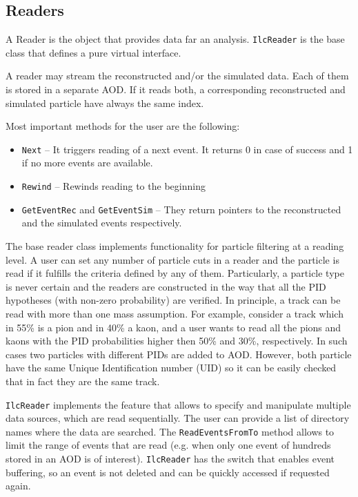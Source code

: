 \documentclass[12pt,a4paper,twoside]{article}
\begin{document}
{%

\subsection{Readers}
\label{cap:soft:secReaders}

A Reader is the object that provides data far an analysis.
\texttt{IlcReader} is the base class that defines a pure virtual
interface. 

A reader may stream the reconstructed and/or the 
simulated data. Each of them is stored in a separate AOD.
If it reads both, a corresponding reconstructed and 
simulated particle have always the same index. 

Most important methods for the user are the following:
\begin{itemize}
\item   \texttt{Next} -- It triggers reading of a next event. It returns 
  0 in case of success and 1 if no more events 
  are available.
\item   \texttt{Rewind} --  Rewinds reading to the beginning
\item   \texttt{GetEventRec} and \texttt{GetEventSim} --  They return 
  pointers to the reconstructed and the simulated events respectively.
\end{itemize}

The base reader class implements functionality for
particle filtering at a reading level. A user can set any
number of particle cuts in a reader and the particle is
read if it fulfills the criteria defined by any of them.
Particularly, a particle type is never certain and the readers
are constructed in the way that all the PID hypotheses (with non-zero 
probability) are verified.
In principle, a track can be read with more than one mass 
assumption.
For example, consider a track
which in 55\% is a pion and in 40\% a kaon, and a user wants to read 
all the pions and kaons with the PID probabilities higher then 
50\% and 30\%, respectively. In such cases two particles 
with different PIDs are added to AOD. 
However, both particle have the same Unique Identification 
number (UID) so it can be easily checked that in fact they are 
the same track.

\texttt{IlcReader} implements the feature that allows to specify and manipulate 
multiple data sources, which are read sequentially. 
The user can provide a list of directory names where the data are searched. 
The \texttt{ReadEventsFromTo} method allows to limit the range of events that are read
(e.g. when only one event of hundreds stored in an AOD is of interest).
\texttt{IlcReader} has the switch that enables event buffering, 
so an event is not deleted and can be quickly accessed if requested again.

}
\end{document}
